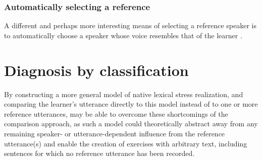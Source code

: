 		
	
		\subsubsection{Automatically selecting a reference}
		\label{sec:selection:auto}
		
		A different and perhaps more interesting means of selecting a reference speaker is to automatically choose a speaker whose voice resembles
that of the learner \citep{Probst2002}. 

	
	


	
	

	\section{Diagnosis by classification}
	\label{sec:diag:classification}
	
		
	
	By constructing a more general model of native lexical stress realization, and comparing the learner's utterance directly to this model instead of to one or more reference utterances, 
	 may be able to overcome these shortcomings of the comparison approach, 
	as such a model could theoretically
	abstract away from any remaining speaker- or utterance-dependent influence from the reference utterance(s)
	and
	enable the creation of exercises with arbitrary text, including sentences for which no reference utterance has been recorded. 
	
